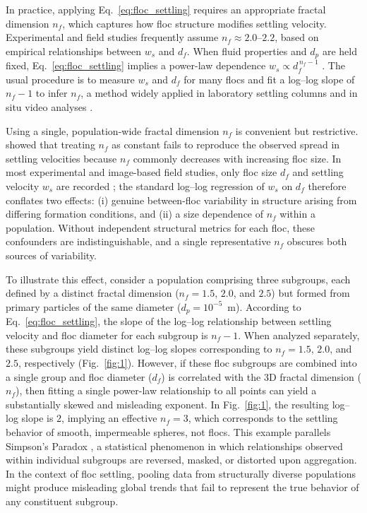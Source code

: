 \documentclass{agujournal2019}
\begin{document}
In practice, applying Eq.~\eqref{eq:floc_settling} requires an appropriate fractal dimension $n_f$, which captures how floc structure modifies settling velocity. Experimental and field studies frequently assume $n_f \approx 2.0$–$2.2$, based on empirical relationships between $w_s$ and $d_f$. When fluid properties and $d_p$ are held fixed, Eq.~\eqref{eq:floc_settling} implies a power-law dependence $w_s \propto d_f^{\,n_f-1}$ \cite{johnson1996settling, li1989fractal}. The usual procedure is to measure $w_s$ and $d_f$ for many flocs and fit a log–log slope of $n_f-1$ to infer $n_f$, a method widely applied in laboratory settling columns and in situ video analyses \cite{kranenburg1994fractal, strom2011explicit, winterwerp1998simple, winterwerp2002flocculation, winterwerp2004introduction, winterwerp2006heuristic}.

Using a single, population-wide fractal dimension $n_f$ is convenient but restrictive.  showed that treating $n_f$ as constant fails to reproduce the observed spread in settling velocities because $n_f$ commonly decreases with increasing floc size. In most experimental and image-based field studies, only floc size $d_f$ and settling velocity $w_s$ are recorded \cite{smith2015image}; the standard log–log regression of $w_s$ on $d_f$ therefore conflates two effects: (i) genuine between-floc variability in structure arising from differing formation conditions, and (ii) a size dependence of $n_f$ within a population. Without independent structural metrics for each floc, these confounders are indistinguishable, and a single representative $n_f$ obscures both sources of variability.

To illustrate this effect, consider a population comprising three subgroups, each defined by a distinct fractal dimension ($n_f = 1.5$, $2.0$, and $2.5$) but formed from primary particles of the same diameter ($d_p = 10^{-5}$~m). According to Eq.~\eqref{eq:floc_settling}, the slope of the log--log relationship between settling velocity and floc diameter for each subgroup is $n_f - 1$. When analyzed separately, these subgroups yield distinct log--log slopes corresponding to $n_f = 1.5$, $2.0$, and $2.5$, respectively (Fig.~\ref{fig:1}). However, if these floc subgroups are combined into a single group and floc diameter ($d_f$) is correlated with the 3D fractal dimension ($n_f$), then fitting a single power-law relationship to all points can yield a substantially skewed and misleading exponent. In Fig.~\ref{fig:1}, the resulting log--log slope is $2$, implying an effective $n_f = 3$, which corresponds to the settling behavior of smooth, impermeable spheres, not flocs. This example parallels Simpson's Paradox \cite{simpson1951interpretation}, a statistical phenomenon in which relationships observed within individual subgroups are reversed, masked, or distorted upon aggregation. In the context of floc settling, pooling data from structurally diverse populations might produce misleading global trends that fail to represent the true behavior of any constituent subgroup.
\end{document}
